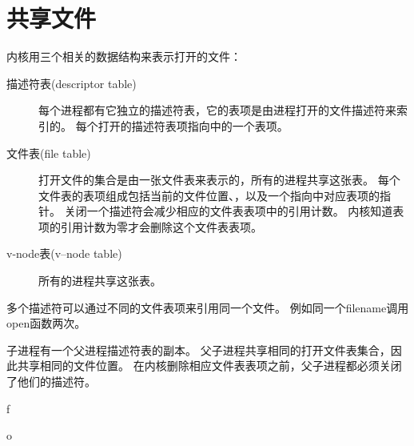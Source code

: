 
\section{共享文件}
{
    内核用三个相关的数据结构来表示打开的文件：

    \begin{description}
        \item[描述符表(descriptor table)]
        {
            每个进程都有它独立的描述符表，它的表项是由进程打开的文件描述符来索引的。
            每个打开的描述符表项指向中的一个表项。
        }
        \item[文件表(file table)]
        {
            打开文件的集合是由一张文件表来表示的，所有的进程共享这张表。
            每个文件表的表项组成包括当前的文件位置、，以及一个指向中对应表项的指针。
            关闭一个描述符会减少相应的文件表表项中的引用计数。
            内核知道表项的引用计数为零才会删除这个文件表表项。
        }
        \item[v-node表(v--node table)] 所有的进程共享这张表。
    \end{description}

    多个描述符可以通过不同的文件表项来引用同一个文件。
    例如同一个filename调用open函数两次。

    子进程有一个父进程描述符表的副本。
    父子进程共享相同的打开文件表集合，因此共享相同的文件位置。
    在内核删除相应文件表表项之前，父子进程都必须关闭了他们的描述符。

    \begin{practicec}
        f
    \end{practicec}

    \begin{practicec}
        o
    \end{practicec}
}

